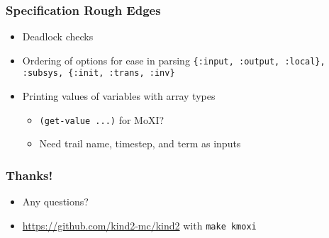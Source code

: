 \documentclass[11pt,xcolor={dvipsnames},hyperref={pdftex,pdfpagemode=UseNone,hidelinks,pdfdisplaydoctitle=true},usepdftitle=false]{beamer}
\newcommand{\code}[1]{{\footnotesize\texttt{#1}}}
\begin{document}
\begin{frame}
    \frametitle{Specification Rough Edges}
    \begin{itemize}
        \item Deadlock checks \pause
        \item Ordering of options for ease in parsing\newline 
        \code{\{:input, :output, :local\}, \newline :subsys, \newline \{:init, :trans, :inv\}} \pause
        \item Printing values of variables with array types
        \begin{itemize}
            \item \code{(get-value ...)} for MoXI?
            \item Need trail name, timestep, and term as inputs
        \end{itemize}
    \end{itemize}
\end{frame}

\begin{frame}
    \frametitle{Thanks!}
    \begin{itemize}
        \item Any questions?
        \item \footnotesize{\url{https://github.com/kind2-mc/kind2}} \newline with \code{make kmoxi}
    \end{itemize}
\end{frame} 
\end{document}
